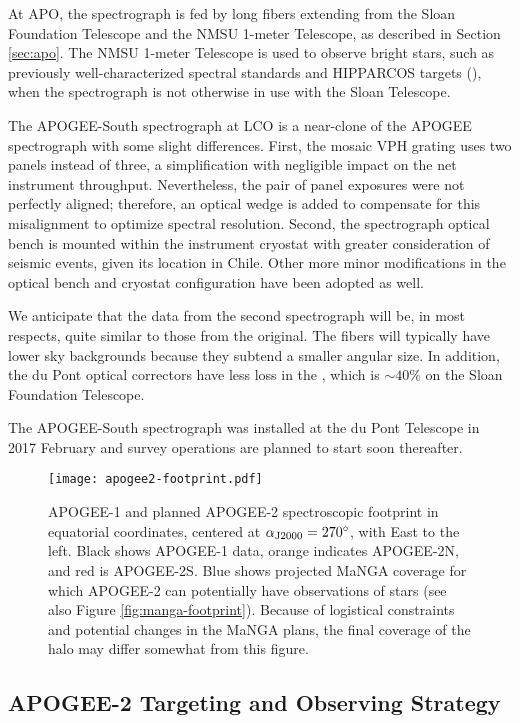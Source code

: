 At APO, the spectrograph is fed by long fibers extending from the
Sloan Foundation Telescope and the NMSU 1-meter Telescope, as
described in Section \ref{sec:apo}.  The NMSU 1-meter Telescope is
used to observe bright stars, such as previously well-characterized
spectral standards and HIPPARCOS targets (\citealt{feuillet16a}), when
the spectrograph is not otherwise in use with the Sloan Telescope.

The APOGEE-South spectrograph at LCO is a near-clone of the APOGEE
spectrograph with some slight differences. First, the mosaic VPH
grating uses two panels instead of three, a simplification with
negligible impact on the net instrument throughput. Nevertheless, the
pair of panel exposures were not perfectly aligned; therefore, an
optical wedge is added to compensate for this misalignment to optimize
spectral resolution.  Second, the spectrograph optical bench is
mounted within the instrument cryostat with greater consideration of
seismic events, given its location in Chile.  Other more minor
modifications in the optical bench and cryostat configuration have
been adopted as well.

We anticipate that the data from the second spectrograph will be, in
most respects, quite similar to those from the original.  The fibers
will typically have lower sky backgrounds because they subtend a
smaller angular size. In addition, the du Pont optical correctors have
less loss in the \Hband, which is $\sim 40\%$ on the Sloan Foundation
Telescope.

The APOGEE-South spectrograph was installed at the du Pont Telescope
in 2017 February and survey operations are planned to start soon
thereafter.

\begin{figure}[t!]
\centering
\texttt{[image: apogee2-footprint.pdf]}
\caption{ \label{fig:apogee2:overview} APOGEE-1 and planned APOGEE-2
  spectroscopic footprint in equatorial coordinates, centered at
  $\alpha_{\rm J2000}=270^\circ$, with East to the left.  Black shows
  APOGEE-1 data, orange indicates APOGEE-2N, and red is APOGEE-2S.
  Blue shows projected MaNGA coverage for which APOGEE-2 can
  potentially have observations of stars (see also Figure
  \ref{fig:manga-footprint}). Because of logistical constraints and
  potential changes in the MaNGA plans, the final coverage of the halo
  may differ somewhat from this figure.}
\end{figure}

\subsection{APOGEE-2 Targeting and Observing Strategy}
\label{sec:apogee2:targeting}

